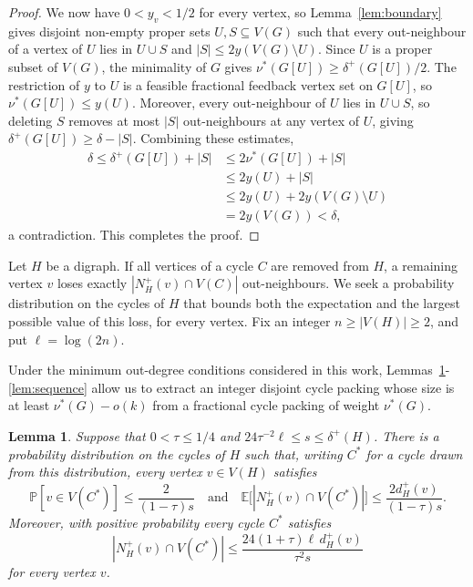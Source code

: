 \documentclass[10pt,a4paper]{article}
\newtheorem{lemma}[theorem]{Lemma}
\numberwithin{equation}{section}
\begin{document}
\begin{proof}
We now have $0<y_v<1/2$ for every vertex, so Lemma~\ref{lem:boundary}
gives disjoint non-empty proper sets $U,S\subseteq V(G)$ such that every
out-neighbour of a vertex of $U$ lies in $U\cup S$ and
$|S|\le2y(V(G)\setminus U)$.
Since $U$ is a proper subset of $V(G)$, the minimality of $G$ gives
$\nu^\ast(G[U])\ge\delta^+(G[U])/2$. The restriction of $y$ to $U$ is a
feasible fractional feedback vertex set on $G[U]$, so
$\nu^\ast(G[U])\le y(U)$. Moreover, every out-neighbour of $U$ lies in
$U\cup S$, so deleting $S$ removes at most $|S|$ out-neighbours at any
vertex of $U$, giving $\delta^+(G[U])\ge\delta-|S|$. Combining these
estimates,
$$
\begin{aligned}
\delta
\le\delta^+(G[U])+|S|&\le2\nu^\ast(G[U])+|S|\\
&\le2y(U)+|S|\\
&\le2y(U)+2y(V(G)\setminus U)\\
&=2y(V(G))<\delta,
\end{aligned}
$$
a contradiction. This completes the proof.
\end{proof}


Let $H$ be a digraph. If all vertices of a cycle 
$C$ are removed from $H$, a remaining vertex $v$ loses exactly 
$|N_H^+(v)\cap V(C)|$ out-neighbours. We seek a probability distribution on the cycles of $H$ 
that bounds both the expectation and the largest possible value of this 
loss, for every vertex.
Fix an integer $n\ge|V(H)|\ge2$, and put $\ell=\log(2n)$.

Under the minimum out-degree conditions considered in this work, Lemmas~\ref{lem:distribution}-\ref{lem:sequence} allow us to extract an integer disjoint cycle packing whose size is at least $\nu^{\ast}(G)-o(k)$ from a fractional cycle packing of weight $\nu^{\ast}(G)$.


\begin{lemma}\label{lem:distribution}
Suppose that $0<\tau\le1/4$ and
$24\tau^{-2}\ell\le s\le\delta^+(H)$.
There is a probability distribution on the cycles of $H$ such that,
writing $C^\ast$ for a cycle drawn from this distribution, every
vertex $v\in V(H)$ satisfies
$$
\mathbb P[v\in V(C^\ast)]\le\frac{2}{(1-\tau)s}
\quad\text{and}\quad
\mathbb E\bigl[|N_H^+(v)\cap V(C^\ast)|\bigr]
\le\frac{2d_H^+(v)}{(1-\tau)s}.
$$
Moreover, with positive probability  every cycle $C^\ast$ satisfies
$$
|N_H^+(v)\cap V(C^\ast)|
\le\frac{24(1+\tau)\ell\,d_H^+(v)}{\tau^2s}
$$
for every vertex $v$.
\end{lemma}
\end{document}
